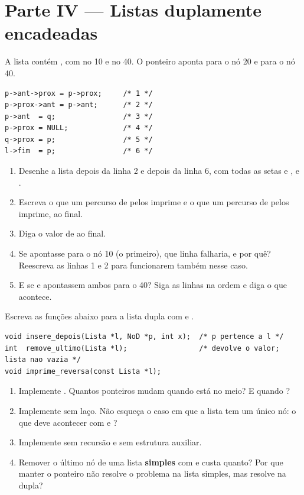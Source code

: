 \documentclass[11pt,a4paper]{article}
\begin{document}
\section{Parte IV --- Listas duplamente encadeadas}

A lista  contém , com  no 10 e
 no 40. O ponteiro  aponta para o nó 20 e  para o nó 40.

\begin{lstlisting}
p->ant->prox = p->prox;     /* 1 */
p->prox->ant = p->ant;      /* 2 */
p->ant  = q;                /* 3 */
p->prox = NULL;             /* 4 */
q->prox = p;                /* 5 */
l->fim  = p;                /* 6 */
\end{lstlisting}

\begin{enumerate}[label=(\alph*),leftmargin=1.8em,itemsep=1pt]
  \item Desenhe a lista depois da linha 2 e depois da linha 6, com todas as setas
         e ,  e .
  \item Escreva o que um percurso de  pelos  imprime e o que um
        percurso de  pelos  imprime, ao final.
  \item Diga o valor de  ao final.
  \item Se  apontasse para o nó 10 (o primeiro), que linha falharia, e por quê?
        Reescreva as linhas 1 e 2 para funcionarem também nesse caso.
  \item E se  e  apontassem ambos para o 40? Siga as linhas na ordem e diga
        o que acontece.
\end{enumerate}

Escreva as funções abaixo para a lista dupla com  e .

\begin{lstlisting}
void insere_depois(Lista *l, NoD *p, int x);  /* p pertence a l */
int  remove_ultimo(Lista *l);                 /* devolve o valor; lista nao vazia */
void imprime_reversa(const Lista *l);
\end{lstlisting}

\begin{enumerate}[label=(\alph*),leftmargin=1.8em,itemsep=1pt]
  \item Implemente . Quantos ponteiros mudam quando  está
        no meio? E quando ?
  \item Implemente  sem laço. Não esqueça o caso em que a lista
        tem um único nó: o que deve acontecer com  e ?
  \item Implemente  sem recursão e sem estrutura auxiliar.
  \item Remover o último nó de uma lista \textbf{simples} com  e 
        custa quanto? Por que manter o ponteiro  não resolve o problema na
        lista simples, mas resolve na dupla?
\end{enumerate}
\end{document}
